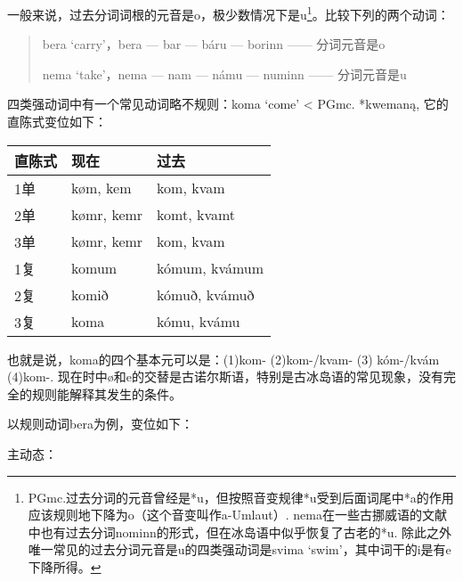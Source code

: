 一般来说，过去分词词根的元音是o，极少数情况下是u\footnote{PGmc.过去分词的元音曾经是*u，但按照音变规律*u受到后面词尾中*a的作用应该规则地下降为o（这个音变叫作a-Umlaut）. nema在一些古挪威语的文献中也有过去分词nominn的形式，但在冰岛语中似乎恢复了古老的*u. 除此之外唯一常见的过去分词元音是u的四类强动词是svima `swim'，其中词干的i是有e下降所得。}。比较下列的两个动词：

\begin{quote}
    bera `carry‌'，bera --- bar --- báru --- borinn ------ 分词元音是o

    nema `take‌'，nema --- nam --- námu --- numinn ------ 分词元音是u
\end{quote}

四类强动词中有一个常见动词略不规则：koma `come' < PGmc.
*kwemaną, 它的直陈式变位如下：

\begin{longtable}{lll}
    \toprule
    直陈式 & 现在         & 过去            \\
    \midrule
    \endhead
    \bottomrule
    \endfoot
    1单  & køm, kem   & kom, kvam     \\
    2单  & kømr, kemr & komt, kvamt   \\
    3单  & kømr, kemr & kom, kvam     \\
    1复  & komum      & kómum, kvámum \\
    2复  & komið      & kómuð, kvámuð \\
    3复  & koma       & kómu, kvámu   \\
\end{longtable}

也就是说，koma的四个基本元可以是：(1)kom- (2)kom-/kvam- (3) kóm-/kvám (4)kom-. 现在时中ø和e的交替是古诺尔斯语，特别是古冰岛语的常见现象，没有完全的规则能解释其发生的条件。

以规则动词bera为例，变位如下：

主动态：

